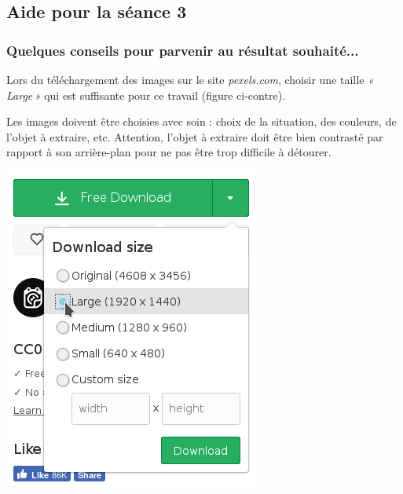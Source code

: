 \subsection{Aide pour la séance 3}

\subsubsection{Quelques conseils pour parvenir au résultat souhaité...}


\begin{minipage}[c]{.67\linewidth}
Lors du téléchargement des images sur le site \emph{pexels.com}, choisir une taille \emph{«\,Large\,»} qui est suffisante pour ce travail (figure ci-contre).

\vspace{6pt}

Les images doivent être choisies avec soin : choix de la situation, des couleurs, de l'objet à extraire, etc. Attention, l'objet à extraire doit être bien contrasté par rapport à son arrière-plan pour ne pas être trop difficile à détourer.

\end{minipage}\hfill
\begin{minipage}[c]{.27\linewidth}
\centering%
\includegraphics[angle=0,width=\textwidth]{./images/image03/pexelsDL}
\end{minipage}


